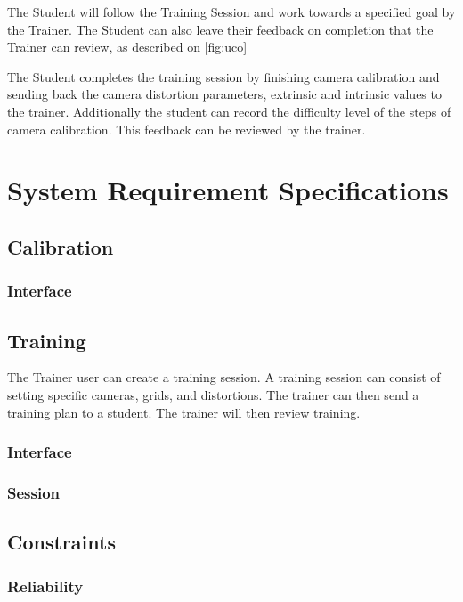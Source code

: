 \documentclass[11pt]{report}
\begin{document}
    The Student will follow the Training Session and work towards a specified goal by the Trainer. The Student can also leave their feedback on completion that the Trainer can review, as described on \ref{fig:uco}

    The Student completes the training session by finishing camera calibration and sending back the camera distortion parameters, extrinsic and intrinsic values to the trainer. Additionally the student can record the difficulty level of the steps of camera calibration. This feedback can be reviewed by the trainer.  


\chapter{System Requirement Specifications}

\section{Calibration}

\subsection{Interface}

\section{Training}

The Trainer user can create a training session. A training session can consist of setting specific cameras, grids, and distortions. The trainer can then send a training plan to a student. 
The trainer will then review training. 
 
\subsection{Interface}
\subsection{Session}


\section{Constraints}

\subsection{Reliability}
\end{document}
